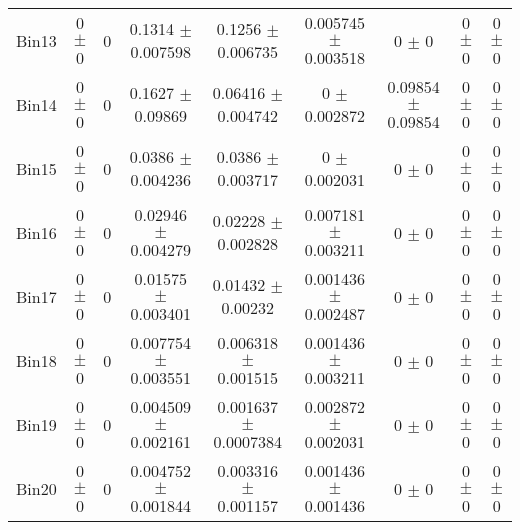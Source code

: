 \begin{tabular}{@{\extracolsep{4pt}}lcccccccc@{}}
     Bin13 & 0 $\pm$ 0 & 0 & 0.1314 $\pm$ 0.007598 & 0.1256 $\pm$ 0.006735 & 0.005745 $\pm$ 0.003518 & 0 $\pm$ 0 & 0 $\pm$ 0 & 0 $\pm$ 0 \\ 
     Bin14 & 0 $\pm$ 0 & 0 & 0.1627 $\pm$ 0.09869 & 0.06416 $\pm$ 0.004742 & 0 $\pm$ 0.002872 & 0.09854 $\pm$ 0.09854 & 0 $\pm$ 0 & 0 $\pm$ 0 \\ 
     Bin15 & 0 $\pm$ 0 & 0 & 0.0386 $\pm$ 0.004236 & 0.0386 $\pm$ 0.003717 & 0 $\pm$ 0.002031 & 0 $\pm$ 0 & 0 $\pm$ 0 & 0 $\pm$ 0 \\ 
     Bin16 & 0 $\pm$ 0 & 0 & 0.02946 $\pm$ 0.004279 & 0.02228 $\pm$ 0.002828 & 0.007181 $\pm$ 0.003211 & 0 $\pm$ 0 & 0 $\pm$ 0 & 0 $\pm$ 0 \\ 
     Bin17 & 0 $\pm$ 0 & 0 & 0.01575 $\pm$ 0.003401 & 0.01432 $\pm$ 0.00232 & 0.001436 $\pm$ 0.002487 & 0 $\pm$ 0 & 0 $\pm$ 0 & 0 $\pm$ 0 \\ 
     Bin18 & 0 $\pm$ 0 & 0 & 0.007754 $\pm$ 0.003551 & 0.006318 $\pm$ 0.001515 & 0.001436 $\pm$ 0.003211 & 0 $\pm$ 0 & 0 $\pm$ 0 & 0 $\pm$ 0 \\ 
     Bin19 & 0 $\pm$ 0 & 0 & 0.004509 $\pm$ 0.002161 & 0.001637 $\pm$ 0.0007384 & 0.002872 $\pm$ 0.002031 & 0 $\pm$ 0 & 0 $\pm$ 0 & 0 $\pm$ 0 \\ 
     Bin20 & 0 $\pm$ 0 & 0 & 0.004752 $\pm$ 0.001844 & 0.003316 $\pm$ 0.001157 & 0.001436 $\pm$ 0.001436 & 0 $\pm$ 0 & 0 $\pm$ 0 & 0 $\pm$ 0 \\ 
\hline\hline
  \end{tabular}
